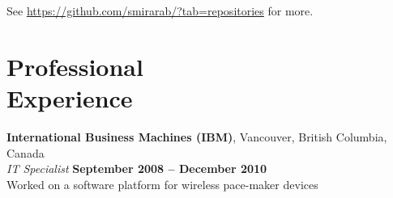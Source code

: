\documentclass[margin,line,letterpaper]{resume}
\begin{document}
\begin{resume}
See \url{https://github.com/smirarab/?tab=repositories} for more. 
    \section{\mysidestyle Professional\\Experience}

    \textbf{International Business Machines (IBM)}, Vancouver, British Columbia, Canada
\vspace{2mm}\\\vspace{1mm}%
    \textsl{IT Specialist} \hfill \textbf{September 2008 -- December 2010}\\
    Worked on a software platform for wireless pace-maker devices





\end{resume}
\end{document}

